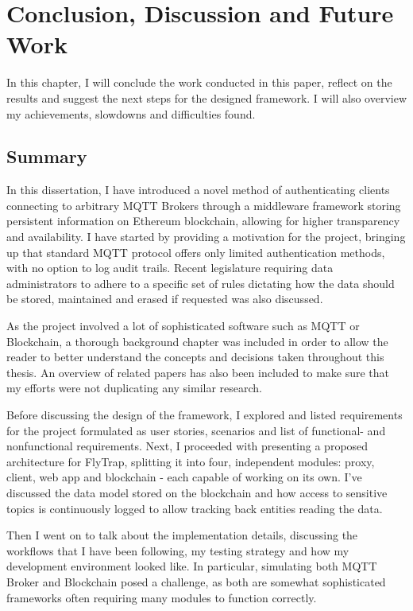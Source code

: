 \chapter{Conclusion, Discussion and Future Work\label{chap:discussion}}
In this chapter, I will conclude the work conducted in this paper, reflect on the results and suggest the next steps for the designed framework. I will also overview my achievements, slowdowns and difficulties found.

\section{Summary}
In this dissertation, I have introduced a novel method of authenticating clients connecting to arbitrary MQTT Brokers through a middleware framework storing persistent information on Ethereum blockchain, allowing for higher transparency and availability. I have started by providing a motivation for the project, bringing up that standard MQTT protocol offers only limited authentication methods, with no option to log audit trails. Recent legislature requiring data administrators to adhere to a specific set of rules dictating how the data should be stored, maintained and erased if requested was also discussed.

As the project involved a lot of sophisticated software such as MQTT or Blockchain, a thorough background chapter was included in order to allow the reader to better understand the concepts and decisions taken throughout this thesis. An overview of related papers has also been included to make sure that my efforts were not duplicating any similar research.

Before discussing the design of the framework, I explored and listed requirements for the project formulated as user stories, scenarios and list of functional- and nonfunctional requirements. Next, I proceeded with presenting a proposed architecture for FlyTrap, splitting it into four, independent modules: proxy, client, web app and blockchain - each capable of working on its own. I've discussed the data model stored on the blockchain and how access to sensitive topics is continuously logged to allow tracking back entities reading the data.

Then I went on to talk about the implementation details, discussing the workflows that I have been following, my testing strategy and how my development environment looked like. In particular, simulating both MQTT Broker and Blockchain posed a challenge, as both are somewhat sophisticated frameworks often requiring many modules to function correctly.

